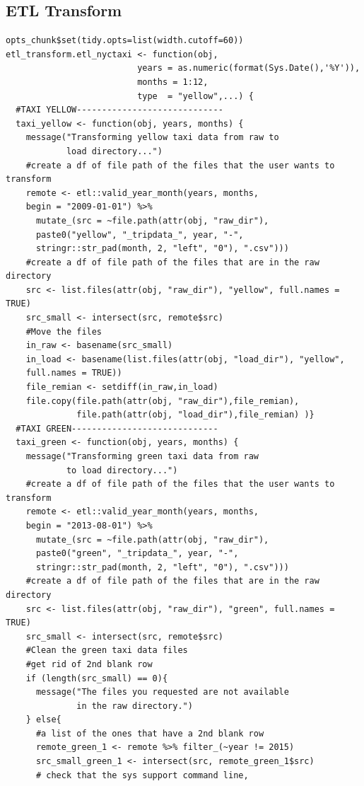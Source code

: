 \documentclass[12pt,twoside]{reedthesis}
\theoremstyle{definition}
\theoremstyle{definition}
\theoremstyle{definition}
\theoremstyle{remark}
\begin{document}
\subsection{ETL Transform}\label{etl-transform}
\begin{verbatim}
opts_chunk$set(tidy.opts=list(width.cutoff=60))
etl_transform.etl_nyctaxi <- function(obj, 
                          years = as.numeric(format(Sys.Date(),'%Y')), 
                          months = 1:12, 
                          type  = "yellow",...) {
  #TAXI YELLOW-----------------------------
  taxi_yellow <- function(obj, years, months) {
    message("Transforming yellow taxi data from raw to 
            load directory...")
    #create a df of file path of the files that the user wants to transform
    remote <- etl::valid_year_month(years, months, 
    begin = "2009-01-01") %>%
      mutate_(src = ~file.path(attr(obj, "raw_dir"), 
      paste0("yellow", "_tripdata_", year, "-",
      stringr::str_pad(month, 2, "left", "0"), ".csv"))) 
    #create a df of file path of the files that are in the raw directory
    src <- list.files(attr(obj, "raw_dir"), "yellow", full.names = TRUE)
    src_small <- intersect(src, remote$src)
    #Move the files
    in_raw <- basename(src_small)
    in_load <- basename(list.files(attr(obj, "load_dir"), "yellow", 
    full.names = TRUE))
    file_remian <- setdiff(in_raw,in_load)
    file.copy(file.path(attr(obj, "raw_dir"),file_remian),
              file.path(attr(obj, "load_dir"),file_remian) )}
  #TAXI GREEN-----------------------------
  taxi_green <- function(obj, years, months) {
    message("Transforming green taxi data from raw 
            to load directory...")
    #create a df of file path of the files that the user wants to transform
    remote <- etl::valid_year_month(years, months, 
    begin = "2013-08-01") %>%
      mutate_(src = ~file.path(attr(obj, "raw_dir"), 
      paste0("green", "_tripdata_", year, "-",
      stringr::str_pad(month, 2, "left", "0"), ".csv"))) 
    #create a df of file path of the files that are in the raw directory
    src <- list.files(attr(obj, "raw_dir"), "green", full.names = TRUE)
    src_small <- intersect(src, remote$src)
    #Clean the green taxi data files
    #get rid of 2nd blank row
    if (length(src_small) == 0){
      message("The files you requested are not available 
              in the raw directory.")
    } else{
      #a list of the ones that have a 2nd blank row
      remote_green_1 <- remote %>% filter_(~year != 2015)
      src_small_green_1 <- intersect(src, remote_green_1$src)
      # check that the sys support command line, 

\end{verbatim}
\end{document}
